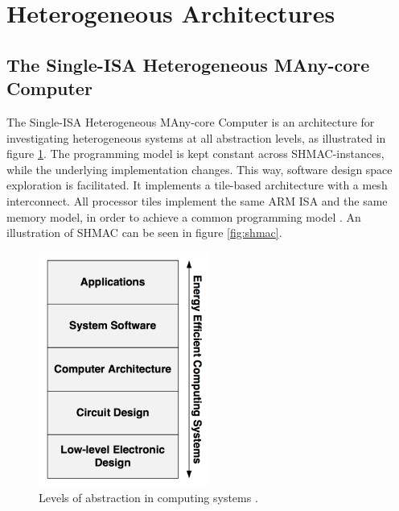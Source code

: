 \section{Heterogeneous Architectures}
\label{sec:heterogeneous}

\subsection{The Single-ISA Heterogeneous MAny-core Computer}
\label{sec:shmac}
The Single-ISA Heterogeneous MAny-core Computer is an architecture for investigating heterogeneous systems at all abstraction levels, as illustrated in figure \ref{fig:shmacAbstractionLevels}.
The programming model is kept constant across SHMAC-instances, while the underlying implementation changes.
This way, software design space exploration is facilitated.
It implements a tile-based architecture with a mesh interconnect. All processor tiles implement the same
ARM ISA and the same memory model, in order to achieve a common programming model \cite{shmac-plan}.
An illustration of SHMAC can be seen in figure \ref{fig:shmac}.

\begin{figure}[htb]
    \centering
    \includegraphics[width=0.5\textwidth]{Figures/Heterogeneous/SHMACAbstractionLevels}
    \caption{Levels of abstraction in computing systems \cite{shmac-plan}.}
    \label{fig:shmacAbstractionLevels}
\end{figure}

